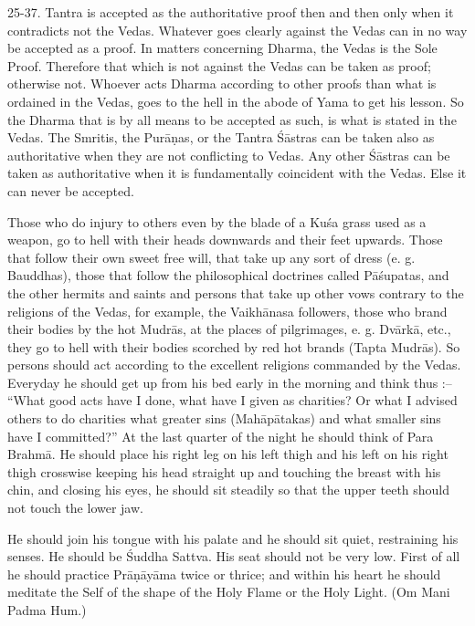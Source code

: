 25-37. Tantra is accepted as the authoritative proof then and then only when it contradicts not the Vedas. Whatever goes clearly against the Vedas can in no way be accepted as a proof. In matters concerning Dharma, the Vedas is the Sole Proof. Therefore that which is not against the Vedas can be taken as proof; otherwise not. Whoever acts Dharma according to other proofs than what is ordained in the Vedas, goes to the hell in the abode of Yama to get his lesson. So the Dharma that is by all means to be accepted as such, is what is stated in the Vedas. The Smritis, the Pur\=a\d{n}as, or the Tantra \'S\=astras can be taken also as authoritative when they are not conflicting to Vedas. Any other \'S\=astras can be taken as authoritative when it is fundamentally coincident with the Vedas. Else it can never be accepted.

Those who do injury to others even by the blade of a Ku\'sa grass used as a weapon, go to hell with their heads downwards and their feet upwards. Those that follow their own sweet free will, that take up any sort of dress (e. g. Bauddhas), those that follow the philosophical doctrines called P\=a\'supatas, and the other hermits and saints and persons that take up other vows contrary to the religions of the Vedas, for example, the Vaikh\=anasa followers, those who brand their bodies by the hot Mudr\=as, at the places of pilgrimages, e. g. Dv\=ark\=a, etc., they go to hell with their bodies scorched by red hot brands (Tapta Mudr\=as). So persons should act according to the excellent religions commanded by the Vedas. Everyday he should get up from his bed early in the morning and think thus :-- ``What good acts have I done, what have I given as charities? Or what I advised others to do charities what greater sins (Mah\=ap\=atakas) and what smaller sins have I committed?'' At the last quarter of the night he should think of Para Brahm\=a. He should place his right leg on his left thigh and his left on his right thigh crosswise keeping his head straight up and touching the breast with his chin, and closing his eyes, he should sit steadily so that the upper teeth should not touch the lower jaw.

He should join his tongue with his palate and he should sit quiet, restraining his senses. He should be \'Suddha Sattva. His seat should not be very low. First of all he should practice Pr\=a\d{n}\=ay\=ama twice or thrice; and within his heart he should meditate the Self of the shape of the Holy Flame or the Holy Light. (Om Mani Padma Hum.)

